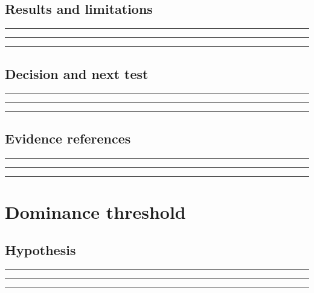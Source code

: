 \documentclass[11pt]{article}
\begin{document}
\subsection{Results and limitations}
\noindent\rule{\linewidth}{0.35pt}\par\vspace{0.22in}
\noindent\rule{\linewidth}{0.35pt}\par\vspace{0.22in}
\noindent\rule{\linewidth}{0.35pt}\par\vspace{0.18in}

\subsection{Decision and next test}
\noindent\rule{\linewidth}{0.35pt}\par\vspace{0.22in}
\noindent\rule{\linewidth}{0.35pt}\par\vspace{0.22in}
\noindent\rule{\linewidth}{0.35pt}\par\vspace{0.18in}

\subsection{Evidence references}
\noindent\rule{\linewidth}{0.35pt}\par\vspace{0.22in}
\noindent\rule{\linewidth}{0.35pt}\par\vspace{0.22in}
\noindent\rule{\linewidth}{0.35pt}\par\vspace{0.18in}
\clearpage

\section{Dominance threshold}

\subsection{Hypothesis}
\noindent\rule{\linewidth}{0.35pt}\par\vspace{0.22in}
\noindent\rule{\linewidth}{0.35pt}\par\vspace{0.22in}
\noindent\rule{\linewidth}{0.35pt}\par\vspace{0.18in}
\end{document}
